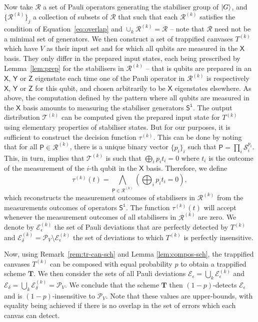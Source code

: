 \documentclass[12pt]{iopart}
\newcommand{\cptp}[1]{\mathsf{#1}} \newcommand{\pd}[1]{\mathcal{#1}}  \newcommand{\sch}[1]{\bm{#1}}
\newcommand{\X}{\cptp{X}}
\newcommand{\Z}{\cptp{Z}}
\newcommand{\Y}{\cptp{Y}}
\renewcommand{\1}{\mathds{1}}
\begin{document}
Now take $\mathcal R$ a set of Pauli operators generating the stabiliser group
of $\ket G$, and $\{\mathcal R^{(k)}\}_j$ a collection of subsets of $\mathcal R$ that
such that each $\mathcal R^{(k)}$ satisfies the condition of
Equation~\ref{eq:overlap} and $\cup_k \mathcal R^{(k)} = \mathcal R$ -- note that $\mathcal R$
need not be a minimal set of generators. We then construct a set of
trappified canvases $T^{(k)}$ which have $V$ as their input set and
for which all qubits are measured in the $\X$ basis. They only differ
in the prepared input states, each being prescribed by
Lemma~\ref{lem:prep} for the stabilisers in $\mathcal R^{(k)}$ -- that is qubits
are prepared in an $\X$, $\Y$ or $\Z$ eigenstate each time one of the
Pauli operator in $\mathcal R^{(k)}$ is respectively $\X$, $\Y$ or $\Z$ for
this qubit, and chosen arbitrarily to be $\X$ eigenstates elsewhere. As above, the
computation defined by the pattern where all qubits are measured in the $\X$ basis amounts to measuring the stabiliser generators $\cptp S^{\mathtt{i}}$. The
output distribution $\pd T^{(k)}$ can be computed given the prepared
input state for $T^{(k)}$ using elementary properties of stabiliser
states. But for our purposes, it is sufficient to construct the
decision function $\tau^{(k)}$. This can be done by noting that for
all $\cptp P \in \mathcal R^{(k)}$, there is a unique binary vector $\{p_i\}_i$ such
that $\cptp P = \prod_i \mathcal S_i^{p_i}$. This, in turn, implies that $\pd
T^{(k)}$ is such that $\bigoplus_i p_i t_i = 0$ where $t_i$ is the
outcome of the measurement of the $i$-th qubit in the $\X$
basis. Therefore, we define
\begin{equation}
\label{eq:general-tau}
\tau^{(k)}(t) = \bigwedge_{\cptp P \in \mathcal R^{(k)}} \left(\bigoplus_i p_i t_i = 0\right),
\end{equation}
which reconstructs the measurement outcomes of stabilisers in
$\mathcal R^{(k)}$ from the measurements outcomes of operators
$\cptp S^{\mathtt{i}}$. The function $\tau^{(k)}(t)$ will accept whenever the measurement outcomes of
all stabilisers in $\mathcal R^{(k)}$ are zero. We denote by $\mathcal
E_\epsilon^{(k)}$ the set of Pauli deviations that are perfectly detected by
$T^{(k)}$ and $\mathcal E_\delta^{(k)} = \mathcal P_V \setminus \mathcal
E_\epsilon^{(k)}$ the set of deviations to which $T^{(k)}$ is perfectly
insensitive.

Now, using Remark~\ref{rem:tr-can-sch} and Lemma \ref{lem:compos-sch}, the
trappified canvases $T^{(k)}$ can be composed with equal probability
$p$ to obtain a trappified scheme $\sch T$. We then consider the sets
of all Pauli deviations $\mathcal E_\epsilon = \bigcup_k \mathcal E_\epsilon^{(k)}$
and $\mathcal E_\delta = \bigcup_k \mathcal E_\delta^{(k)} = \mathcal P_V$. We
conclude that the scheme $\sch T$ then $(1-p)$-detects $\mathcal E_\epsilon$
and is $(1-p)$-insensitive to $\mathcal P_V$. Note that these values are upper-bounds,
with equality being achieved if there is no overlap in the set of errors which
each canvas can detect.
\end{document}
